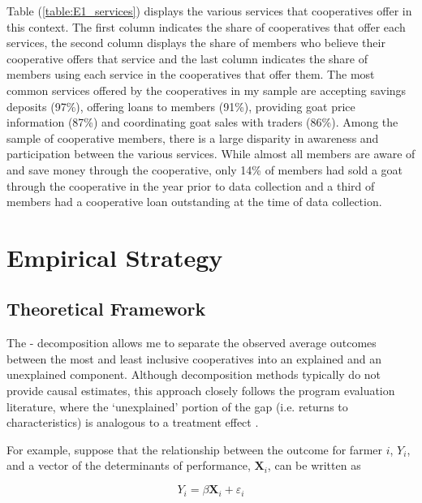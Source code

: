 \documentclass[11pt]{article}
\begin{document}
Table (\ref{table:E1_services}) displays the various services that cooperatives offer in this context. The first column indicates the share of cooperatives that offer each services, the second column displays the share of members who believe their cooperative offers that service and the last column indicates the share of members using each service in the cooperatives that offer them. The most common services offered by the cooperatives in my sample are accepting savings deposits (97\%), offering loans to members (91\%), providing goat price information (87\%) and coordinating goat sales with traders (86\%). Among the sample of cooperative members, there is a large disparity in awareness and participation between the various services. While almost all members are aware of and save money through the cooperative, only 14\% of members had sold a goat through the cooperative in the year prior to data collection and a third of members had a cooperative loan outstanding at the time of data collection.


\section{Empirical Strategy} \label{sec:E1_emp}

\subsection{Theoretical Framework} \label{sec:E1_theory}

The \citet{oaxaca_male-female_1973}-\citet{blinder_wage_1973} decomposition allows me to separate the observed average outcomes between the most and least inclusive cooperatives into an explained and an unexplained component. Although decomposition methods typically do not provide causal estimates, this approach closely follows the program evaluation literature, where the `unexplained' portion of the gap (i.e. returns to characteristics) is analogous to a treatment effect \citep{n_fortin_notitle_2011}.

For example, suppose that the relationship between the outcome for farmer $i$, $Y_i$, and a vector of the determinants of performance, $\mathbf{X}_i$, can be written as

\begin{equation} \label{eq:E1_1}
    Y_i = \beta \mathbf{X}_i + \varepsilon_i
\end{equation}  
\end{document}
